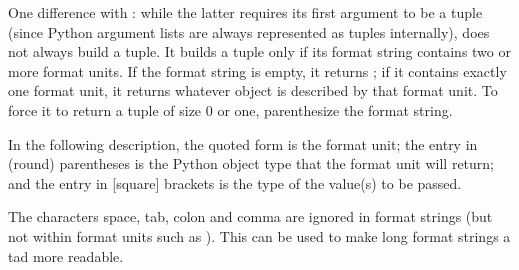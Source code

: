 \documentclass{manual}
\begin{document}
One difference with : while the latter
requires its first argument to be a tuple (since Python argument lists
are always represented as tuples internally),
 does not always build a tuple.  It builds
a tuple only if its format string contains two or more format units.
If the format string is empty, it returns ; if it contains
exactly one format unit, it returns whatever object is described by
that format unit.  To force it to return a tuple of size 0 or one,
parenthesize the format string.

In the following description, the quoted form is the format unit; the
entry in (round) parentheses is the Python object type that the format
unit will return; and the entry in [square] brackets is the type of
the \C{} value(s) to be passed.

The characters space, tab, colon and comma are ignored in format
strings (but not within format units such as ).  This can be
used to make long format strings a tad more readable.
\end{document}
